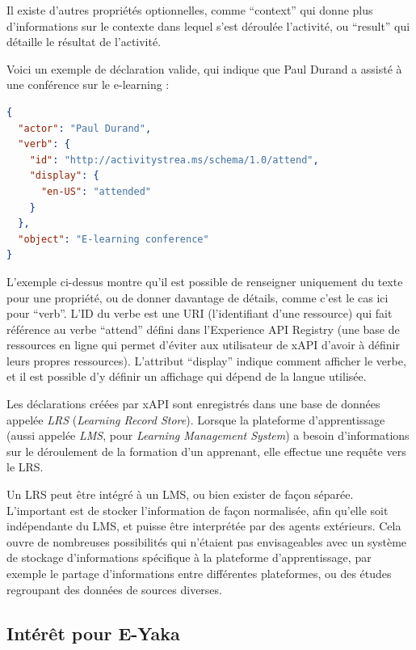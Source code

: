             \let\myitem\relax

            Il existe d’autres propriétés optionnelles, comme \enquote{context} qui donne plus d’informations sur le contexte dans lequel s’est déroulée l’activité, ou \enquote{result} qui détaille le résultat de l’activité.

            Voici un exemple de déclaration valide, qui indique que Paul Durand a assisté à une conférence sur le e-learning :

\begin{lstlisting}[language=json, numbers=none]
{
  "actor": "Paul Durand",
  "verb": {
    "id": "http://activitystrea.ms/schema/1.0/attend",
    "display": { 
      "en-US": "attended" 
    }
  },
  "object": "E-learning conference"
}
\end{lstlisting}

            L’exemple ci-dessus montre qu’il est possible de renseigner uniquement du texte pour une propriété, ou de donner davantage de détails, comme c’est le cas ici pour \enquote{verb}. L’ID du verbe est une URI (l’identifiant d’une ressource) qui fait référence au verbe \enquote{attend} défini dans l’Experience API Registry (une base de ressources en ligne qui permet d’éviter aux utilisateur de xAPI d’avoir à définir leurs propres ressources). L’attribut \enquote{display} indique comment afficher le verbe, et il est possible d’y définir un affichage qui dépend de la langue utilisée.

            Les déclarations créées par xAPI sont enregistrés dans une base de données appelée \emph{LRS} (\emph{Learning Record Store}). Lorsque la plateforme d’apprentissage (aussi appelée \emph{LMS}, pour \emph{Learning Management System}) a besoin d’informations sur le déroulement de la formation d’un apprenant, elle effectue une requête vers le LRS.

            Un LRS peut être intégré à un LMS, ou bien exister de façon séparée. L’important est de stocker l’information de façon normalisée, afin qu’elle soit indépendante du LMS, et puisse être interprétée par des agents extérieurs. Cela ouvre de nombreuses possibilités qui n’étaient pas envisageables avec un système de stockage d’informations spécifique à la plateforme d’apprentissage, par exemple le partage d’informations entre différentes plateformes, ou des études regroupant des données de sources diverses.

        \subsection{Intérêt pour E-Yaka}

